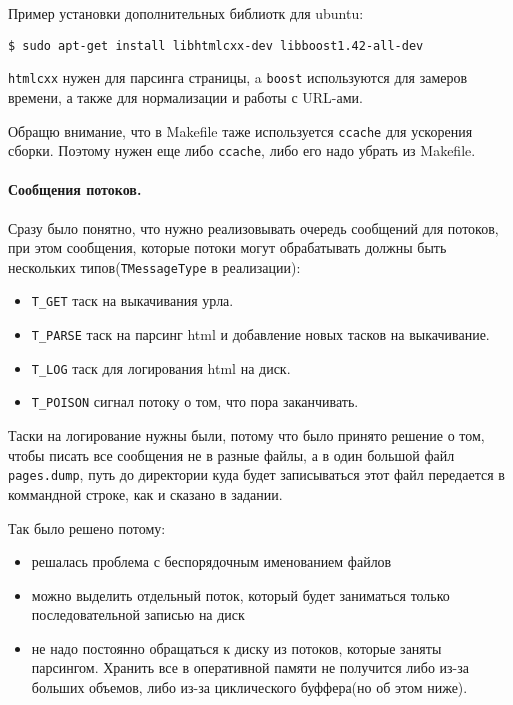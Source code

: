 \documentclass[12pt]{article}
\begin{document}
Пример установки дополнительных библиотк для ubuntu:
\begin{verbatim}
$ sudo apt-get install libhtmlcxx-dev libboost1.42-all-dev
\end{verbatim}

\verb|htmlcxx| нужен для парсинга страницы, a \verb|boost| используются
для замеров времени, а также для нормализации и работы с URL-ами.

Обращю внимание, что в Makefile таже используется \verb|ccache| для ускорения
сборки. Поэтому нужен еще либо \verb|ccache|, либо его надо убрать из Makefile.

\paragraph{Сообщения потоков.}
Сразу было понятно, что нужно реализовывать очередь сообщений для потоков,
при этом сообщения, которые потоки могут обрабатывать должны быть нескольких
типов(\verb|TMessageType| в реализации):
\begin{itemize}
    \item \verb|T_GET| таск на выкачивания урла.
    \item \verb|T_PARSE| таск на парсинг html и добавление новых тасков
          на выкачивание.
    \item \verb|T_LOG| таск для логирования html на диск.
    \item \verb|T_POISON| сигнал потоку о том, что пора заканчивать.
\end{itemize}

Таски на логирование нужны были, потому что было принято решение о том, чтобы
писать все сообщения не в разные файлы, а в один большой файл \verb|pages.dump|,
путь до директории куда будет записываться этот файл передается в коммандной строке,
как и сказано в задании.

Так было решено потому:
\begin{itemize}
    \item решалась проблема с беспорядочным именованием файлов
    \item можно выделить отдельный поток, который будет заниматься только
          последовательной записью на диск
    \item не надо постоянно обращаться к диску из потоков, которые заняты парсингом.
          Хранить все в оперативной памяти не получится либо из-за больших объемов,
          либо из-за циклического буффера(но об этом ниже).
\end{itemize}
\end{document}

